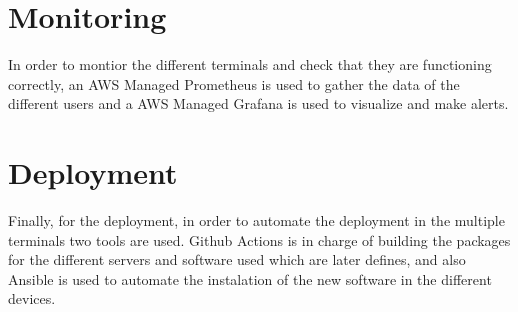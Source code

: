 \section{Monitoring}

In order to montior the different terminals and check that they are functioning correctly, an AWS Managed Prometheus is used to gather the data of the different users and a AWS Managed Grafana is used to visualize and make alerts.

\section{Deployment}

Finally, for the deployment, in order to automate the deployment in the multiple terminals two tools are used. Github Actions is in charge of building the packages for the different servers and software used which are later defines, and also Ansible is used to automate the instalation of the new software in the different devices.

